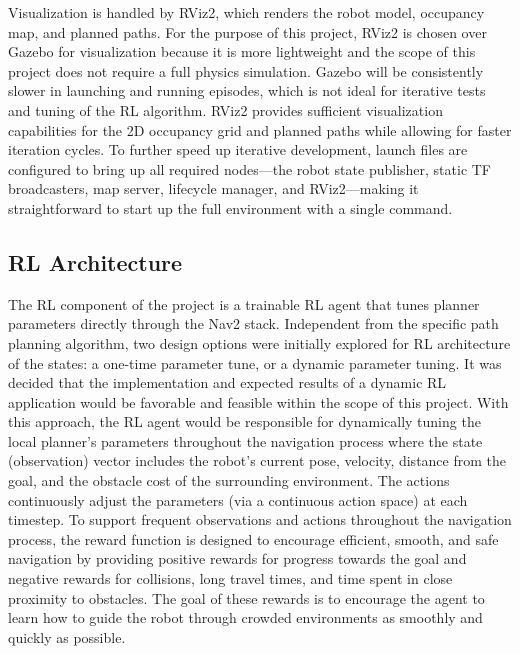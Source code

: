 \documentclass[conference]{IEEEtran}
\begin{document}
    Visualization is handled by RViz2, which renders the robot model, occupancy map, and planned paths. For the purpose of this project, RViz2 is chosen
    over Gazebo for visualization because it is more lightweight and the scope of this project does not require a full physics simulation. Gazebo will
    be consistently slower in launching and running episodes, which is not ideal for iterative tests and tuning of the RL algorithm. RViz2 provides
    sufficient visualization capabilities for the 2D occupancy grid and planned paths while allowing for faster iteration cycles. To further speed up iterative development, launch files are configured to bring up all required nodes---the robot state publisher, static TF broadcasters, map server, lifecycle manager,
    and RViz2---making it straightforward to start up the full environment with a single command. 

    \subsection{RL Architecture}
    The RL component of the project is a trainable RL agent that tunes planner parameters directly through the Nav2 stack. Independent from the
    specific path planning algorithm, two design options were initially explored for RL architecture of the states: a one-time parameter tune, or a
    dynamic parameter tuning. It was decided that the implementation and expected results of a dynamic RL application would be favorable and feasible
    within the scope of this project. With this approach, the RL agent would be responsible for dynamically tuning the local planner's parameters
    throughout the navigation process where the state (observation) vector includes the robot's current pose, velocity, distance from the goal, and the obstacle cost of the surrounding environment. The actions continuously adjust the parameters (via a continuous action space) at each timestep. To support frequent observations and actions throughout the navigation process, the reward function is designed to encourage efficient, smooth, and safe navigation by providing positive rewards for progress towards the goal and negative rewards for collisions, long travel times, and time spent in close proximity to obstacles. The goal of these rewards is to encourage the agent to learn how to guide the robot through crowded environments as smoothly and quickly as possible.

\end{document}
